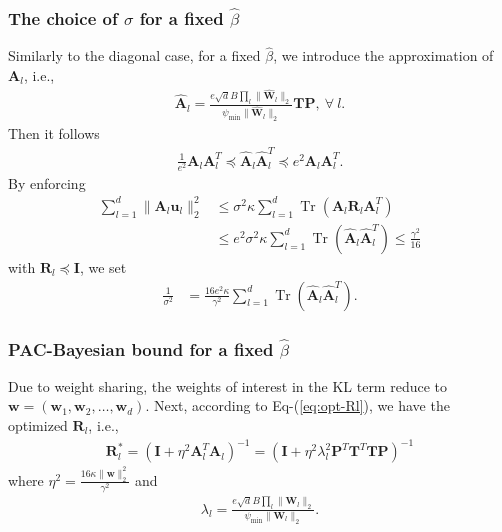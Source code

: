 \documentclass[journal]{IEEEtran} %
\def\eqref#1{Eq-(\ref{#1})}
\def\vu{{\bm{u}}}
\def\vw{{\bm{w}}}
\def\mA{{\bm{A}}}
\def\mI{{\bm{I}}}
\def\mP{{\bm{P}}}
\def\mR{{\bm{R}}}
\def\mT{{\bm{T}}}
\def\mW{{\bm{W}}}
\newcommand{\Norm}[1]{\|#1\|}
\DeclareMathOperator{\Tr}{Tr}
\begin{document}
\subsubsection{The choice of $\sigma$ for a fixed $\hat{\beta}$}
Similarly to the diagonal case, for a fixed $\hat{\beta}$, we introduce the approximation of $\mA_l$, i.e., 
\begin{align}
        \hat{\mA}_l =  \frac{ e\sqrt{d}B \prod_l \Norm{\hat{\mW}_l}_2}{\psi_{\min}\Norm{\hat{\mW}_l}_2}\mT \mP, \ \forall~l.
\end{align}
Then it follows
\begin{align}
   \frac{1}{e^2} \mA_l \mA_l^T \preceq \hat{\mA}_l \hat{\mA}_l^T \preceq e^2 \mA_l \mA_l^T.
\end{align}
% 
By enforcing
\begin{align}
   \sum_{l=1}^d \Norm{{\mA}_l {\vu}_l}_2^2 &\le \sigma^2 \kappa \sum_{l=1}^d \Tr({\mA}_l {\mR}_l {\mA}_l^T)\\
   &\le e^2 \sigma^2 \kappa \sum_{l=1}^d \Tr(\hat{\mA}_l \hat{\mA}_l^T)
   \le  \frac{\gamma^2}{16}
\end{align}
with ${\mR}_l \preceq \mI$, we set
\begin{align}
    \frac{1}{{\sigma}^2} &= \frac{16e^2 \kappa}{\gamma^2} \sum_{l=1}^d \Tr(\hat{\mA}_l \hat{\mA}_l^T).
\end{align}

\subsubsection{PAC-Bayesian bound for a fixed $\hat{\beta}$}
Due to weight sharing, the weights of interest in the KL term reduce to $\vw=(\vw_1,\vw_2,\dots,\vw_d)$.
Next, according to \eqref{eq:opt-Rl}, we have the optimized ${\mR}_l$, i.e.,
\begin{align} \label{eq:toeplitz-Rl}
    {\mR}_l^* = (\mI+{\eta}^2 \mA_l^T\mA_l )^{-1}
    = (\mI+{\eta}^2 {\lambda}_l^2 \mP^T \mT^T  \mT \mP)^{-1}
\end{align}
where $\eta^2=\frac{16   \kappa \Norm{\vw}_2^2}{\gamma^2}$ and 
\begin{align}
    \lambda_l = \frac{ e\sqrt{d}B  \prod_l \Norm{\mW_l}_2}{\psi_{\min}\Norm{\mW_l}_2}.
\end{align}
\end{document}
